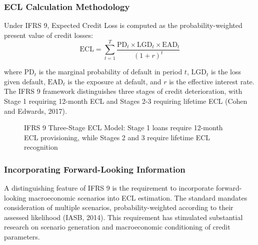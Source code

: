 \documentclass[12pt,a4paper]{article}
\newcommand{\ECL}{\text{ECL}}
\newcommand{\EAD}{\text{EAD}}
\newcommand{\LGD}{\text{LGD}}
\newcommand{\PD}{\text{PD}}
\begin{document}
\subsubsection{ECL Calculation Methodology}

Under IFRS 9, Expected Credit Loss is computed as the probability-weighted present value of credit losses:
\begin{equation}
\ECL = \sum_{t=1}^{T} \frac{\PD_t \times \LGD_t \times \EAD_t}{(1+r)^t}
\end{equation}

where $\PD_t$ is the marginal probability of default in period $t$, $\LGD_t$ is the loss given default, $\EAD_t$ is the exposure at default, and $r$ is the effective interest rate. The IFRS 9 framework distinguishes three stages of credit deterioration, with Stage 1 requiring 12-month ECL and Stages 2-3 requiring lifetime ECL (Cohen and Edwards, 2017).

\begin{figure}[H]
\centering
{}
\caption{IFRS 9 Three-Stage ECL Model: Stage 1 loans require 12-month ECL provisioning, while Stages 2 and 3 require lifetime ECL recognition}
\label{fig:ifrs9_stages}
\end{figure}

\subsubsection{Incorporating Forward-Looking Information}

A distinguishing feature of IFRS 9 is the requirement to incorporate forward-looking macroeconomic scenarios into ECL estimation. The standard mandates consideration of multiple scenarios, probability-weighted according to their assessed likelihood (IASB, 2014). This requirement has stimulated substantial research on scenario generation and macroeconomic conditioning of credit parameters.
\end{document}
